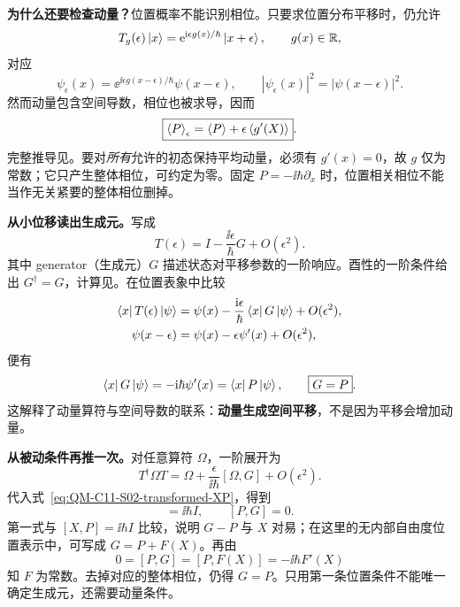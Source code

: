 \textbf{为什么还要检查动量？}位置概率不能识别相位。只要求位置分布平移时，仍允许
\begin{equation}
  T_g(\epsilon)\left|x\right\rangle
   =\mathrm{e}^{\mathrm{i}\epsilon g(x)/\hbar}\left|x+\epsilon\right\rangle,
  \qquad g(x)\in\mathbb{R},
\end{equation}
对应
\begin{equation}
  \psi_\epsilon(x)
   =\ee^{\ii\epsilon g(x-\epsilon)/\hbar}\psi(x-\epsilon),
  \qquad |\psi_\epsilon(x)|^2=|\psi(x-\epsilon)|^2.
\end{equation}
然而动量包含空间导数，相位也被求导，因而
\begin{equation}
  \boxed{\left\langle P \right\rangle_\epsilon=\left\langle P \right\rangle
      +\epsilon\left\langle g'(X) \right\rangle}.
\end{equation}
完整推导见。要对\emph{所有}允许的初态保持平均动量，必须有 $g'(x)=0$，故 $g$ 仅为常数；它只产生整体相位，可约定为零。固定 $P=-\ii\hbar\partial_x$ 时，位置相关相位不能当作无关紧要的整体相位删掉。

\textbf{从小位移读出生成元。}写成
\begin{equation}
  T(\epsilon)=I-\frac{\ii\epsilon}{\hbar}G+O(\epsilon^2).
\end{equation}
其中 generator（生成元）$G$ 描述状态对平移参数的一阶响应。酉性的一阶条件给出 $G^\dagger=G$，计算见。在位置表象中比较
\begin{align}
  \left\langle x\right| T(\epsilon)\left|\psi\right\rangle
    &=\psi(x)-\frac{\mathrm{i}\epsilon}{\hbar}\left\langle x\right|G\left|\psi\right\rangle
       +O(\epsilon^2),\\
  \psi(x-\epsilon)
    &=\psi(x)-\epsilon\psi'(x)+O(\epsilon^2),
\end{align}
便有
\begin{equation}
  \left\langle x\right|G\left|\psi\right\rangle=-\mathrm{i}\hbar\psi'(x)=\left\langle x\right|P\left|\psi\right\rangle,
  \qquad \boxed{G=P}.
\end{equation}
这解释了动量算符与空间导数的联系：\textbf{动量生成空间平移}，不是因为平移会增加动量。

\textbf{从被动条件再推一次。}对任意算符 $\Omega$，一阶展开为
\begin{equation}
  T^\dagger\Omega T
   =\Omega+\frac{\epsilon}{\ii\hbar}[\Omega,G]
       +O(\epsilon^2).
\end{equation}
代入式~\eqref{eq:QM-C11-S02-transformed-XP}，得到
\begin{equation}
  [X,G]=\ii\hbar I,\qquad [P,G]=0.
\end{equation}
第一式与 $[X,P]=\ii\hbar I$ 比较，说明 $G-P$ 与 $X$ 对易；在这里的无内部自由度位置表示中，可写成 $G=P+F(X)$。再由
\begin{equation}
  0=[P,G]=[P,F(X)]=-\ii\hbar F'(X)
\end{equation}
知 $F$ 为常数。去掉对应的整体相位，仍得 $G=P$。只用第一条位置条件不能唯一确定生成元，还需要动量条件。

